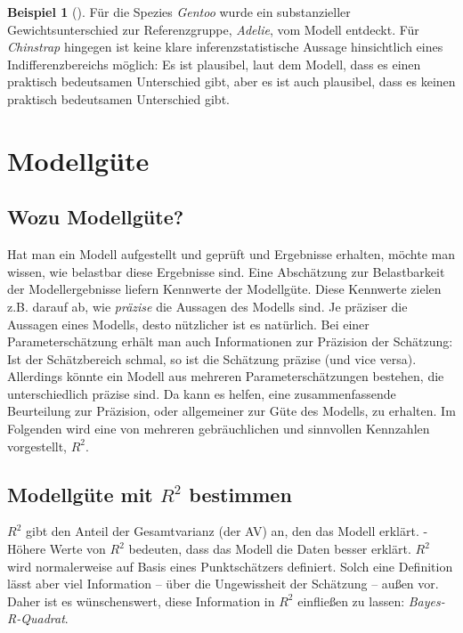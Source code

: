 \documentclass[
  ngerman,
  letterpaper,
  twoside,
  open=any]{scrbook}
\theoremstyle{definition}
\newtheorem{example}{Beispiel}[chapter]
\theoremstyle{plain}
\theoremstyle{definition}
\theoremstyle{definition}
\theoremstyle{remark}
\begin{document}
\begin{example}[]
Für die Spezies \emph{Gentoo} wurde ein substanzieller
Gewichtsunterschied zur Referenzgruppe, \emph{Adelie}, vom Modell
entdeckt. Für \emph{Chinstrap} hingegen ist keine klare
inferenzstatistische Aussage hinsichtlich eines Indifferenzbereichs
möglich: Es ist plausibel, laut dem Modell, dass es einen praktisch
bedeutsamen Unterschied gibt, aber es ist auch plausibel, dass es keinen
praktisch bedeutsamen Unterschied gibt.

\section{Modellgüte}\label{modellguxfcte}

\subsection{Wozu Modellgüte?}\label{wozu-modellguxfcte}

Hat man ein Modell aufgestellt und geprüft und Ergebnisse erhalten,
möchte man wissen, wie belastbar diese Ergebnisse sind. Eine Abschätzung
zur Belastbarkeit der Modellergebnisse liefern Kennwerte der Modellgüte.
Diese Kennwerte zielen z.B. darauf ab, wie \emph{präzise} die Aussagen
des Modells sind. Je präziser die Aussagen eines Modells, desto
nützlicher ist es natürlich. Bei einer Parameterschätzung erhält man
auch Informationen zur Präzision der Schätzung: Ist der Schätzbereich
schmal, so ist die Schätzung präzise (und vice versa). Allerdings könnte
ein Modell aus mehreren Parameterschätzungen bestehen, die
unterschiedlich präzise sind. Da kann es helfen, eine zusammenfassende
Beurteilung zur Präzision, oder allgemeiner zur Güte des Modells, zu
erhalten. Im Folgenden wird eine von mehreren gebräuchlichen und
sinnvollen Kennzahlen vorgestellt, \(R^2\).

\subsection{\texorpdfstring{Modellgüte mit \(R^2\)
bestimmen}{Modellgüte mit R\^{}2 bestimmen}}\label{modellguxfcte-mit-r2-bestimmen}

\(R^2\) gibt den Anteil der Gesamtvarianz (der AV) an, den das Modell
erklärt. - Höhere Werte von \(R^2\) bedeuten, dass das Modell die Daten
besser erklärt. \(R^2\) wird normalerweise auf Basis eines
Punktschätzers definiert. Solch eine Definition lässt aber viel
Information -- über die Ungewissheit der Schätzung -- außen vor. Daher
ist es wünschenswert, diese Information in \(R^2\) einfließen zu lassen:
\emph{Bayes-R-Quadrat}.


\end{example}
\end{document}
